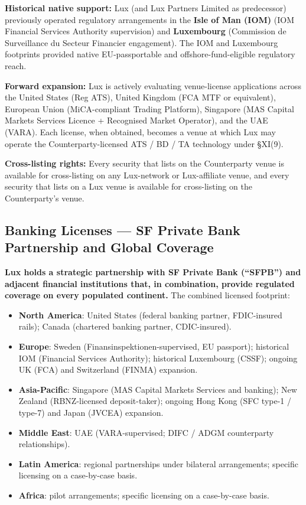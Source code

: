 \documentclass[11pt,letterpaper]{article}
\begin{document}
\textbf{Historical native support:} Lux (and Lux Partners Limited
as predecessor) previously operated regulatory arrangements in the
\textbf{Isle of Man (IOM)} (IOM Financial Services Authority
supervision) and \textbf{Luxembourg} (Commission de Surveillance du
Secteur Financier engagement). The IOM and Luxembourg footprints
provided native EU-passportable and offshore-fund-eligible regulatory
reach.

\textbf{Forward expansion:} Lux is actively evaluating venue-license
applications across the United States (Reg ATS), United Kingdom
(FCA MTF or equivalent), European Union (MiCA-compliant Trading
Platform), Singapore (MAS Capital Markets Services Licence +
Recognised Market Operator), and the UAE (VARA). Each license,
when obtained, becomes a venue at which Lux may operate the
Counterparty-licensed ATS / BD / TA technology under \S XI(9).

\textbf{Cross-listing rights:} Every security that lists on the
Counterparty venue is available for cross-listing on any Lux-network
or Lux-affiliate venue, and every security that lists on a Lux
venue is available for cross-listing on the Counterparty's venue.

\subsection*{Banking Licenses --- SF Private Bank Partnership and Global Coverage}

\textbf{Lux holds a strategic partnership with SF Private Bank
(``SFPB'') and adjacent financial institutions that, in combination,
provide regulated coverage on every populated continent.} The
combined licensed footprint:

\begin{itemize}[leftmargin=1.5em,itemsep=0.1em]
\item \textbf{North America}: United States (federal banking partner,
FDIC-insured rails); Canada (chartered banking partner, CDIC-insured).
\item \textbf{Europe}: Sweden (Finansinspektionen-supervised, EU
passport); historical IOM (Financial Services Authority); historical
Luxembourg (CSSF); ongoing UK (FCA) and Switzerland (FINMA) expansion.
\item \textbf{Asia-Pacific}: Singapore (MAS Capital Markets Services
and banking); New Zealand (RBNZ-licensed deposit-taker); ongoing
Hong Kong (SFC type-1 / type-7) and Japan (JVCEA) expansion.
\item \textbf{Middle East}: UAE (VARA-supervised; DIFC / ADGM
counterparty relationships).
\item \textbf{Latin America}: regional partnerships under bilateral
arrangements; specific licensing on a case-by-case basis.
\item \textbf{Africa}: pilot arrangements; specific licensing on a
case-by-case basis.
\end{itemize}
\end{document}
